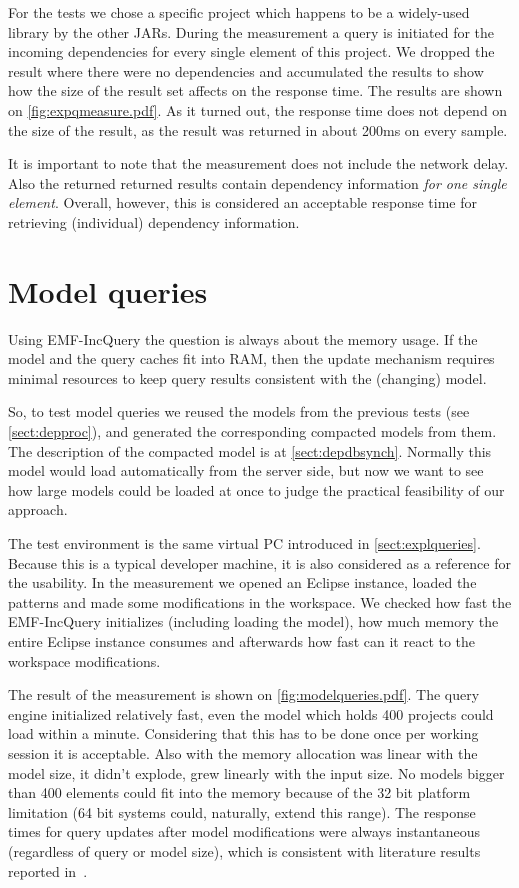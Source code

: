For the tests we chose a specific project which happens to be a widely-used
library by the other JARs. During the measurement a query is initiated for 
the incoming dependencies for every single element of this project. 
We dropped the result where there were no dependencies and accumulated the
results to show how the size of the result set affects on the response time.
The results are shown on \autoref{fig:expqmeasure.pdf}.
As it turned out, the response time does not depend on the size of the
result, as the result was returned in about 200ms on every sample.

It is important to note that the measurement does not include the network delay.
Also the returned returned results contain dependency information \emph{for one
single element}. Overall, however, this is considered an acceptable response
time for retrieving (individual) dependency information.


\section{Model queries}
Using EMF-IncQuery the question is always about the memory usage. If the model
and the query caches fit into RAM, then the update mechanism requires minimal
resources to keep query results consistent with the (changing) model.

So, to test model queries we reused the models from the previous tests (see
\autoref{sect:depproc}), and generated the corresponding compacted models from
them.
The description of the compacted model is at \autoref{sect:depdbsynch}. Normally
this model would load automatically from the server side, but now we want to see
how large models could be loaded at once to judge the practical feasibility of
our approach.

The test environment is the same virtual PC introduced in
\autoref{sect:explqueries}. Because this is a typical developer machine, it is
also considered as a reference for the usability. In the measurement we opened
an Eclipse instance, loaded the patterns and made some modifications in the
workspace. We checked how fast the EMF-IncQuery initializes (including loading
the model), how much memory the entire Eclipse instance consumes and afterwards
how fast can it react to the workspace modifications.

The result of the measurement is shown on \autoref{fig:modelqueries.pdf}.
The query engine initialized relatively fast, even the model which holds 400
projects could load within a minute. Considering that this has to be done once
per working session it is acceptable. Also with the memory allocation was linear
with the model size, it didn't explode, grew linearly with the input size.
No models bigger than 400 elements could fit into the memory because of the 32
bit platform limitation (64 bit systems could, naturally, extend this range).
The response times for query updates after model modifications were always
instantaneous (regardless of query or model size), which is consistent with
literature results reported in~\cite{MODELS10}.


